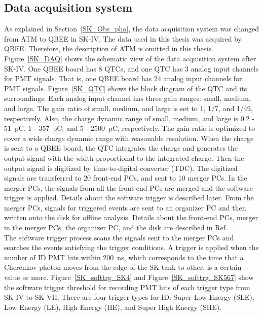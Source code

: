 \subsection{Data acquisition system}\label{subsec_data_acqu}
\vs\hs
As explained in Section~\ref{SK_Obs_pha}, the data acquisition system was changed from ATM to QBEE in SK-IV.
The data used in this thesis was acquired by QBEE.
Therefore, the description of ATM is omitted in this thesis.\\
\hs
Figure~\ref{SK_DAQ} shows the schematic view of the data acquisition system after SK-IV.
One QBEE board has 8 QTCs, and one QTC has 3 analog input channels for PMT signals.
That is, one QBEE board has 24 analog input channels for PMT signals.
Figure~\ref{SK_QTC} shows the block diagram of the QTC and its surroundings.
Each analog input channel has three gain ranges: small, medium, and large.
The gain ratio of small, medium, and large is set to 1, 1$/$7, and 1$/$49, respectively.
Also, the charge dynamic range of small, medium, and large is 0.2 - 51~pC, 1 - 357~pC, and 5 - 2500~pC, respectively.
The gain ratio is optimized to cover a wide charge dynamic range with reasonable resolution.
When the charge is sent to a QBEE board, the QTC integrates the charge and generates the output signal with the width proportional to the integrated charge.
Then the output signal is digitized by time-to-digital converter (TDC).
The digitized signals are transferred to 20 front-end PCs, and sent to 10 merger PCs.
In the merger PCs, the signals from all the front-end PCs are merged and the software trigger is applied.
Details about the software trigger is described later.
From the merger PCs, signals for triggered events are sent to an organizer PC and then written onto the disk for offline analysis.
Details about the front-end PCs, merger in the merger PCs, the organizer PC, and the disk are described in Ref.~\cite{2010Yamada}.\\
\hs
The software trigger process scans the signals sent to the merger PCs and searches the events satisfying the trigger conditions.
A trigger is applied when the number of ID PMT hits within 200~ns, which corresponds to the time that a Cherenkov photon moves from the edge of the SK tank to other, is a certain value or more.
Figure~\ref{SK_softtrg_SK4} and Figure~\ref{SK_softtrg_SK567} show the software trigger threshold for recording PMT hits of each trigger type from SK-IV to SK-VII.
There are four trigger types for ID: Super Low Energy (SLE), Low Energy (LE), High Energy (HE), and Super High Energy (SHE).
